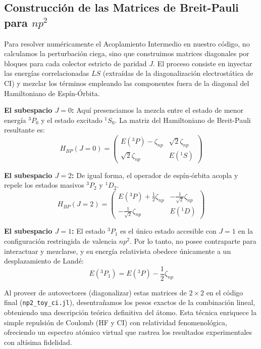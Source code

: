 \documentclass[11pt,a4paper]{article}
\begin{document}
\subsection{Construcción de las Matrices de Breit-Pauli para $np^2$}
Para resolver numéricamente el Acoplamiento Intermedio en nuestro código, no calculamos la perturbación ciega, sino que construimos matrices diagonales por bloques para cada colector estricto de paridad $J$. El proceso consiste en inyectar las energías correlacionadas $LS$ (extraídas de la diagonalización electrostática de CI) y mezclar los términos empleando las componentes fuera de la diagonal del Hamiltoniano de Espín-Órbita.

\textbf{El subespacio $J=0$:}
Aquí presenciamos la mezcla entre el estado de menor energía $^3P_0$ y el estado excitado $^1S_0$. La matriz del Hamiltoniano de Breit-Pauli resultante es:
\begin{equation}
H_{BP}(J=0) = \begin{pmatrix}
E( ^3P ) - \zeta_{np} & \sqrt{2}\zeta_{np} \\
\sqrt{2}\zeta_{np} & E( ^1S )
\end{pmatrix}
\end{equation}

\textbf{El subespacio $J=2$:}
De igual forma, el operador de espín-órbita acopla y repele los estados masivos $^3P_2$ y $^1D_2$.
\begin{equation}
H_{BP}(J=2) = \begin{pmatrix}
E( ^3P ) + \frac{1}{2}\zeta_{np} & -\frac{1}{\sqrt{2}}\zeta_{np} \\
-\frac{1}{\sqrt{2}}\zeta_{np} & E( ^1D )
\end{pmatrix}
\end{equation}

\textbf{El subespacio $J=1$:}
El estado $^3P_1$ es el único estado accesible con $J=1$ en la configuración restringida de valencia $np^2$. Por lo tanto, no posee contraparte para interactuar y mezclarse, y su energía relativista obedece únicamente a un desplazamiento de Landé:
\begin{equation}
E( ^3P_1 ) = E( ^3P ) - \frac{1}{2}\zeta_{np}
\end{equation}

Al proveer de autovectores (diagonalizar) estas matrices de $2 \times 2$ en el código final (\texttt{np2\_toy\_ci.jl}), desentrañamos los pesos exactos de la combinación lineal, obteniendo una descripción teórica definitiva del átomo. Esta técnica enriquece la simple repulsión de Coulomb (HF y CI) con relatividad fenomenológica, ofreciendo un espectro atómico virtual que rastrea los resultados experimentales con altísima fidelidad.
\end{document}
